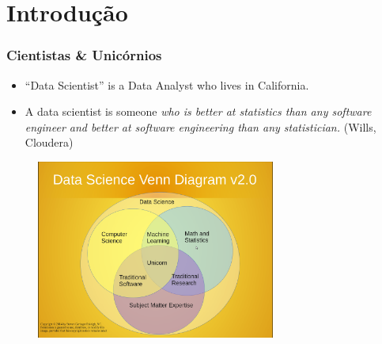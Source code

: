 \documentclass[hyperref={pdfpagelabels=true}]{beamer}
\begin{document}
\section{Introdu\c{c}\~{a}o} 
\begin{frame}
\frametitle{Cientistas \& Unic\'{o}rnios}
\centering
\tiny{ 
      \begin{itemize}    
       \item<1->\small{``Data Scientist'' is a Data Analyst who lives in California.} 
       \item<1->A data scientist is someone \textit{who is better at statistics than any software engineer and better at software engineering than any statistician.} (Wills, Cloudera)
      \end{itemize}                
}
    \begin{figure}   
         \includegraphics[width=0.7\textwidth]{venn.png}  
    \end{figure}     


\end{frame}
\end{document}
